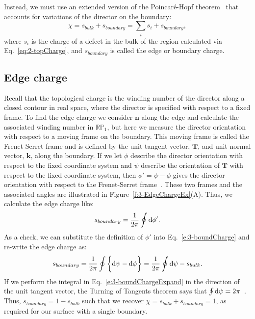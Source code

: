 Instead, we must use an extended version of the Poincar\'e-Hopf theorem~\cite{RN267} that accounts for variations of the director on the boundary:
\begin{equation}
  \chi = s_{bulk} + s_{boundary} = \sum\limits_i s_i + s_{boundary},\label{e:3-extendedPH}
\end{equation}
where $s_i$ is the charge of a defect in the bulk of the region calculated via Eq.~\ref{eq:2-topCharge}, and $s_{boundary}$ is called the edge or boundary charge.


\subsection{Edge charge}
Recall that the topological charge is the winding number of the director along a closed contour in real space, where the director is specified with respect to a fixed frame.
To find the edge charge we consider $\mathbf{n}$ along the edge and calculate the associated winding number in $\mathbb{R}\mathbb{P}_1$, but here we measure the director orientation with respect to a moving frame on the boundary.
This moving frame is called the Frenet-Serret frame and is defined by the unit tangent vector, $\mathbf{T}$, and unit normal vector, $\mathbf{k}$, along the boundary.
If we let $\phi$ describe the director orientation with respect to the fixed coordinate system and $\psi$ describe the orientation of $\mathbf{T}$ with respect to the fixed coordinate system, then $\phi' = \psi-\phi$ gives the director orientation with respect to the Frenet-Serret frame~\cite{RN35,RN23}.
These two frames and the associated angles are illustrated in Figure~\ref{f:3-EdgeChargeEx}(A).
Thus, we calculate the edge charge like:
\begin{equation}
  s_{boundary} = \frac{1}{2\pi} \oint \textup{d}\phi'\label{e:3-boundCharge}.
\end{equation}
As a check, we can substitute the definition of $\phi'$ into Eq.~\ref{e:3-boundCharge} and re-write the edge charge as:
\begin{equation}
  s_{boundary} = \frac{1}{2\pi} \oint \bigg \{ \textup{d}\psi - \textup{d}\phi \bigg \} = \frac{1}{2\pi} \oint \textup{d}\psi - s_{bulk}.\label{e:3-boundChargeExpand}
\end{equation}
If we perform the integral in Eq.~\ref{e:3-boundChargeExpand} in the direction of the unit tangent vector, the Turning of Tangents theorem says that $ \oint \textup{d}\psi = 2\pi$~\cite{RN35}.
Thus, $s_{boundary} = 1 - s_{bulk}$ such that we recover $\chi = s_{bulk} + s_{boundary} = 1$, as required for our surface with a single boundary.

